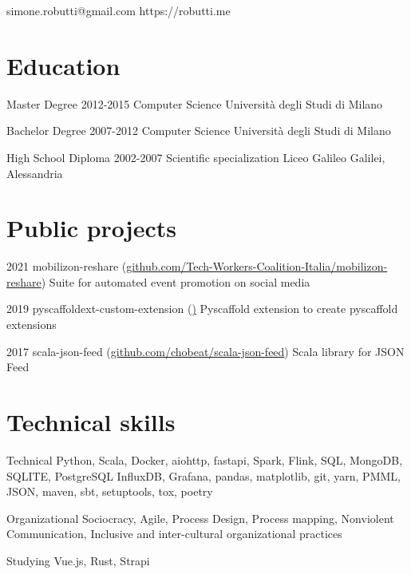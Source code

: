 \documentclass{tccv}
\begin{document}
    {simone.robutti@gmail.com}
    {https://robutti.me}

\section{Education}

\begin{yearlist}

\item[Master Degree]{2012-2015}
     {Computer Science}
     {Università degli Studi di Milano}

\item[Bachelor Degree]{2007-2012}
{Computer Science}
{Università degli Studi di Milano}

\item[High School Diploma]{2002-2007}
{Scientific specialization}
{Liceo Galileo Galilei, Alessandria}



\end{yearlist}

\section{Public projects}

\begin{yearlist}

\item{2021}
     {mobilizon-reshare (\href{https://github.com/Tech-Workers-Coalition-Italia/mobilizon-reshare}{github.com/Tech-Workers-Coalition-Italia/mobilizon-reshare})}
     {Suite for automated event promotion on social media}
\item{2019}
     {pyscaffoldext-custom-extension  (\href{github.com/pyscaffold/pyscaffoldext-custom-extension})}
     {Pyscaffold extension to create pyscaffold extensions}
\item{2017}
     {scala-json-feed (\href{https://github.com/chobeat/scala-json-feed}{github.com/chobeat/scala-json-feed})}
     {Scala library for JSON Feed}


\end{yearlist}

\section{Technical skills}

\begin{factlist}

\item{Technical}
     {Python, Scala, Docker, aiohttp, fastapi, Spark, Flink, SQL, MongoDB, SQLITE, PostgreSQL InfluxDB, Grafana, pandas, matplotlib, git, yarn, PMML, JSON, maven, sbt, setuptools, tox, poetry}

\item{Organizational}
{Sociocracy, Agile, Process Design, Process mapping, Nonviolent Communication, Inclusive and inter-cultural organizational practices}


\item{Studying}
     {Vue.js, Rust, Strapi}


\end{factlist}
\end{document}
